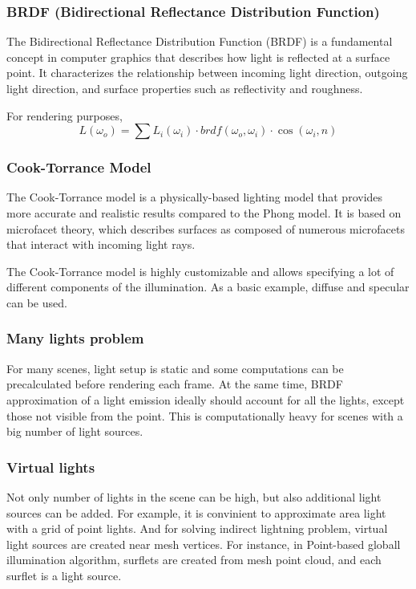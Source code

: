 \documentclass[twocolumn]{article}
\begin{document}
\subsubsection{BRDF (Bidirectional Reflectance Distribution Function)}
The Bidirectional Reflectance Distribution Function (BRDF) is a fundamental concept in computer graphics that describes how light is reflected at a surface point.
It characterizes the relationship between incoming light direction, outgoing light direction, and surface properties such as reflectivity and roughness.

For rendering purposes,
$$L(\omega_o) = \sum L_i(\omega_i) \cdot brdf(\omega_o,\omega_i) \cdot \cos(\omega_i, n)$$

\subsubsection{Cook-Torrance Model}
The Cook-Torrance model is a physically-based lighting model that provides more accurate and realistic results compared to the Phong model.
It is based on microfacet theory, which describes surfaces as composed of numerous microfacets that interact with incoming light rays.

The Cook-Torrance model is highly customizable and allows specifying a lot of different components of the illumination.
As a basic example, diffuse and specular can be used.

\subsubsection{Many lights problem}

For many scenes, light setup is static and some computations can be precalculated before rendering each frame.
At the same time, BRDF approximation of a light emission ideally should account for all the lights, except those not visible from the point.
This is computationally heavy for scenes with a big number of light sources.

\subsubsection{Virtual lights}

Not only number of lights in the scene can be high, but also additional light sources can be added.
For example, it is convinient to approximate area light with a grid of point lights.
And for solving indirect lightning problem, virtual light sources are created near mesh vertices.
For instance, in Point-based globall illumination algorithm, surflets are created from mesh point cloud, and each surflet is a light source.
\end{document}
